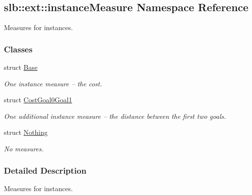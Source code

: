 \hypertarget{namespaceslb_1_1ext_1_1instanceMeasure}{}\subsection{slb\+:\+:ext\+:\+:instance\+Measure Namespace Reference}
\label{namespaceslb_1_1ext_1_1instanceMeasure}


Measures for instances.  


\subsubsection*{Classes}
\begin{DoxyCompactItemize}
\item 
struct \hyperlink{structslb_1_1ext_1_1instanceMeasure_1_1Base}{Base}
\begin{DoxyCompactList}\small\item\em One instance measure -- the cost. \end{DoxyCompactList}\item 
struct \hyperlink{structslb_1_1ext_1_1instanceMeasure_1_1CostGoal0Goal1}{Cost\+Goal0\+Goal1}
\begin{DoxyCompactList}\small\item\em One additional instance measure -- the distance between the first two goals. \end{DoxyCompactList}\item 
struct \hyperlink{structslb_1_1ext_1_1instanceMeasure_1_1Nothing}{Nothing}
\begin{DoxyCompactList}\small\item\em No measures. \end{DoxyCompactList}\end{DoxyCompactItemize}


\subsubsection{Detailed Description}
Measures for instances. 